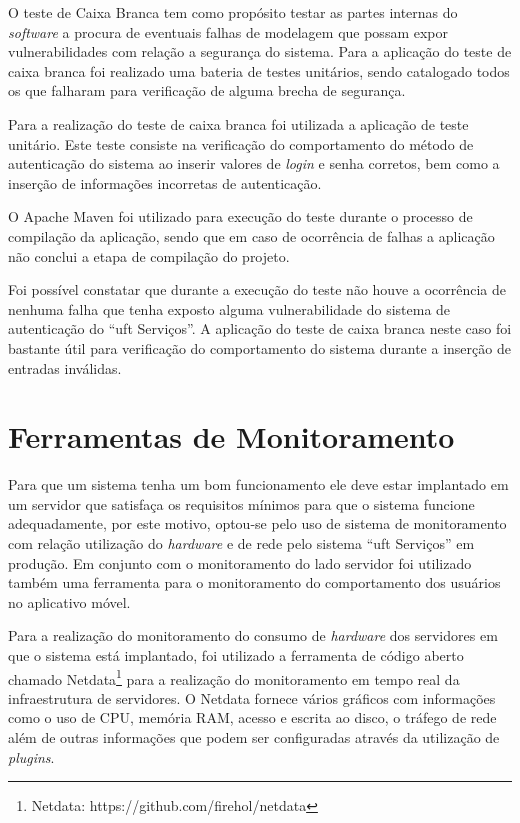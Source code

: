 O teste de Caixa Branca tem como propósito testar as partes internas do \textit{software} a procura de eventuais falhas de modelagem que possam expor vulnerabilidades com relação a segurança do sistema. Para a aplicação do teste de caixa branca foi realizado uma bateria de testes unitários, sendo catalogado todos os que falharam para verificação de alguma brecha de segurança.

Para a realização do teste de caixa branca foi utilizada a aplicação de teste unitário. Este teste consiste na verificação do comportamento do método de autenticação do sistema ao inserir valores de \textit{login} e senha corretos, bem como a inserção de informações incorretas de autenticação.

O Apache Maven foi utilizado para execução do teste durante o processo de compilação da aplicação, sendo que em caso de ocorrência de falhas a aplicação não conclui a etapa de compilação do projeto.

Foi possível constatar que durante a execução do teste não houve a ocorrência de nenhuma falha que tenha exposto alguma vulnerabilidade do sistema de autenticação do ``\acrshort{uft} Serviços''. A aplicação do teste de caixa branca neste caso foi bastante útil para verificação do comportamento do sistema durante a inserção de entradas inválidas.

\section{Ferramentas de Monitoramento}

\noindent Para que um sistema tenha um bom funcionamento ele deve estar implantado em um servidor que satisfaça os requisitos mínimos para que o sistema funcione adequadamente, por este motivo, optou-se pelo uso de sistema de monitoramento com relação utilização do \textit{hardware} e de rede pelo sistema ``\acrshort{uft} Serviços'' em produção. Em conjunto com o monitoramento do lado servidor foi utilizado também uma ferramenta para o monitoramento do comportamento dos usuários no aplicativo móvel.

Para a realização do monitoramento do consumo de \textit{hardware} dos servidores em que o sistema está implantado, foi utilizado a ferramenta de código aberto chamado Netdata\footnote{Netdata: https://github.com/firehol/netdata} para a realização do monitoramento em tempo real da infraestrutura de servidores. O Netdata fornece vários gráficos com informações como o uso de CPU, memória RAM, acesso e escrita ao disco, o tráfego de rede além de outras informações que podem ser configuradas através da utilização de \textit{plugins}.

